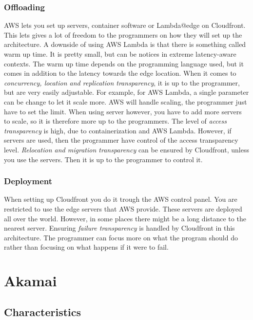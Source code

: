 \subsubsection{Offloading}
AWS lets you set up servers, container software or Lambda@edge on Cloudfront. This lets gives a lot of freedom to the programmers on how they will set up the architecture. A downside of using AWS Lambda is that there is something called warm up time. It is pretty small, but can be notices in extreme latency-aware contexts. The warm up time depends on the programming language used, but it comes in addition to the latency towards the edge location. When it comes to \textit{concurrency, location and replication transparency}, it is up to the programmer, but are very easily adjustable. For example, for AWS Lambda, a single parameter can be change to let it scale more. AWS will handle scaling, the programmer just have to set the limit. When using server however, you have to add more servers to scale, so it is therefore more up to the programmers. The level of \textit{access transparency} is high, due to containerization and AWS Lambda. However, if servers are used, then the programmer have control of the access transparency level. \textit{Relocation and migration transparency} can be ensured by Cloudfront, unless you use the servers. Then it is up to the programmer to control it. 


\subsubsection{Deployment}
When setting up Cloudfront you do it trough the AWS control panel. You are restricted to use the edge servers that AWS provide. These servers are deployed all over the world. However, in some places there might be a long distance to the nearest server. Ensuring \textit{failure transparency} is handled by Cloudfront in this architecture. The programmer can focus more on what the program should do rather than focusing on what happens if it were to fail. 









\section{Akamai}
\subsection{Characteristics}
